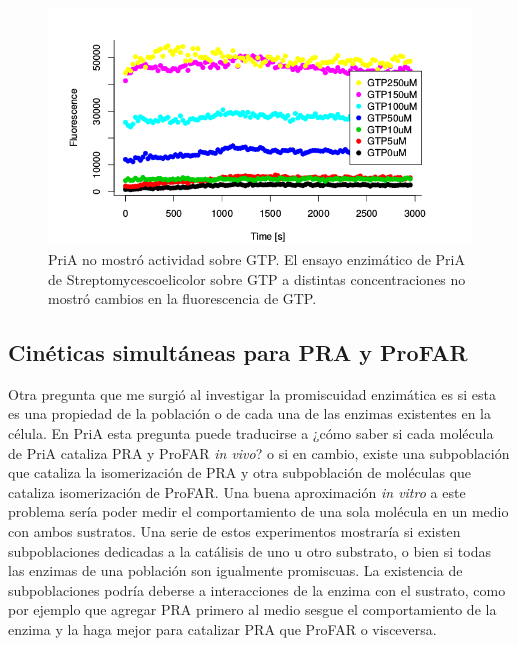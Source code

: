 \documentclass[12pt,twoside]{reedthesis}
\begin{document}
  \begin{figure}[h!tbp]
  \centering
  \includegraphics[angle = 0,scale = 0.6]{chapter4/GTP.png}
  \caption[PriA no mostró actividad sobre GTP a diversas concentraciones]{\footnotesize{PriA no mostró actividad sobre GTP. El ensayo enzimático de PriA de {Streptomyces}{coelicolor} sobre GTP a distintas concentraciones no mostró cambios en la fluorescencia de GTP.}}
  \label{fig:GTP}
  \end{figure}
  
  \clearpage 
  
  \subsection{Cinéticas simultáneas para PRA y
  ProFAR}\label{cineticas-simultaneas-para-pra-y-profar}
  
  Otra pregunta que me surgió al investigar la promiscuidad enzimática es
  si esta es una propiedad de la población o de cada una de las enzimas
  existentes en la célula. En PriA esta pregunta puede traducirse a ¿cómo
  saber si cada molécula de PriA cataliza PRA y ProFAR \emph{in vivo}? o
  si en cambio, existe una subpoblación que cataliza la isomerización de
  PRA y otra subpoblación de moléculas que cataliza isomerización de
  ProFAR. Una buena aproximación \emph{in vitro} a este problema sería
  poder medir el comportamiento de una sola molécula en un medio con ambos
  sustratos. Una serie de estos experimentos mostraría si existen
  subpoblaciones dedicadas a la catálisis de uno u otro substrato, o bien
  si todas las enzimas de una población son igualmente promiscuas. La
  existencia de subpoblaciones podría deberse a interacciones de la enzima
  con el sustrato, como por ejemplo que agregar PRA primero al medio
  sesgue el comportamiento de la enzima y la haga mejor para catalizar PRA
  que ProFAR o visceversa.
  
\end{document}

